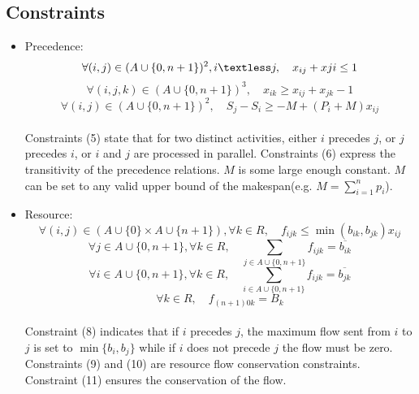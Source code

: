 \documentclass{paper}
\begin{document}
	\subsection{Constraints}
	\begin{itemize}
		\item Precedence:
	   \begin{equation}
		\forall (i,j) \in (A\cup \{0,n+1\})^2, i\textless j, \quad x_{ij}+x{ji}\leq 1 
	   \end{equation}
	   \begin{equation}
		\forall (i,j,k) \in (A\cup \{0,n+1\})^3, \quad x_{ik}\geq x_{ij}+x_{jk}-1 
	   \end{equation}
	   \begin{equation}
		\forall (i,j) \in (A\cup \{0,n+1\})^2, \quad S_j-S_i\geq -M+(P_i+M)x_{ij} 
	   \end{equation}
	   \\Constraints (5) state that for two distinct activities, either $i$ precedes $j$, or $j$ precedes $i$, or $i$ and $j$ are processed in parallel. 
	   Constraints (6) express the transitivity of the precedence relations.
	   $M$ is some large enough constant. $M$ can be set to any valid upper bound of the makespan(e.g. $M=\sum_{i = 1}^{n}p_i$).
	   \item Resource:
	   \begin{equation}
	   \forall (i,j) \in (A\cup \{0\}\times A\cup \{n+1\}),\forall k \in R, \quad f_{ijk}\leq \min(b_{ik},b_{jk})x_{ij}
	   \end{equation}
	   \begin{equation}
         \forall j \in A\cup \{0,n+1\}, \forall k \in R, \quad \sum_{j\in A\cup \{0,n+1\}} f_{ijk}=\overline{b_{ik}} 
	   \end{equation}
	   \begin{equation}
		\forall i \in A\cup \{0,n+1\}, \forall k \in R, \quad \sum_{i\in A\cup \{0,n+1\}} f_{ijk}=\overline{b_{jk}} 
	   \end{equation}
	   \begin{equation}
		\forall k \in R, \quad f_{(n+1)0k}=B_k
	   \end{equation}
	   \\Constraint (8) indicates that if $i$ precedes $j$, the maximum flow sent from $i$ to $j$ is set to $\min \{b_i,b_j\}$ while if $i$ does not precede $j$ the flow must be zero. 
	   Constraints (9) and (10) are resource flow conservation constraints. 
	   Constraint (11) ensures the conservation of the flow.
	\end{itemize}
	
\end{document}
